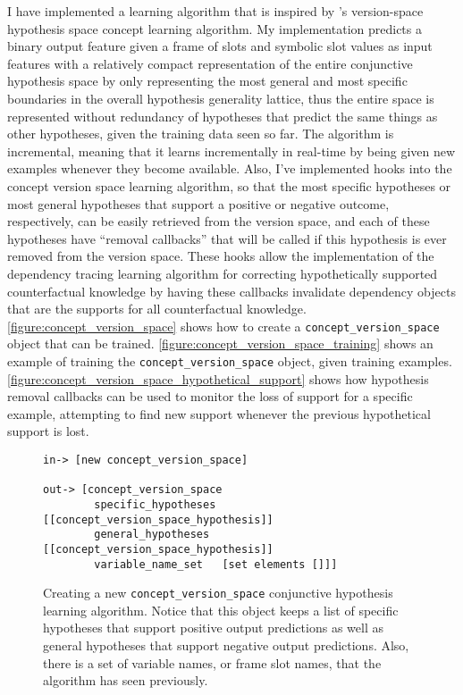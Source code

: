 I have implemented a learning algorithm that is inspired by
\citeauthor{mitchell:1997}'s \citeyear{mitchell:1997} version-space
hypothesis space concept learning algorithm.  My implementation
predicts a binary output feature given a frame of slots and symbolic
slot values as input features with a relatively compact representation
of the entire conjunctive hypothesis space by only representing the
most general and most specific boundaries in the overall hypothesis
generality lattice, thus the entire space is represented without
redundancy of hypotheses that predict the same things as other
hypotheses, given the training data seen so far.  The algorithm is
incremental, meaning that it learns incrementally in real-time by
being given new examples whenever they become available.  Also, I've
implemented hooks into the concept version space learning algorithm,
so that the most specific hypotheses or most general hypotheses that
support a positive or negative outcome, respectively, can be easily
retrieved from the version space, and each of these hypotheses have
``removal callbacks'' that will be called if this hypothesis is ever
removed from the version space.  These hooks allow the implementation
of the dependency tracing learning algorithm for correcting
hypothetically supported counterfactual knowledge by having these
callbacks invalidate dependency objects that are the supports for all
counterfactual knowledge.
{\mbox{\autoref{figure:concept_version_space}}} shows how to create a
{\tt{concept\_version\_space}} object that can be trained.
{\mbox{\autoref{figure:concept_version_space_training}}} shows an
example of training the {\tt{concept\_version\_space}} object, given
training examples.
{\mbox{\autoref{figure:concept_version_space_hypothetical_support}}}
shows how hypothesis removal callbacks can be used to monitor the loss
of support for a specific example, attempting to find new support
whenever the previous hypothetical support is lost.
\begin{figure}[h]
\centering
{\small
\begin{Verbatim}[frame=single]
 in-> [new concept_version_space]

out-> [concept_version_space
        specific_hypotheses [[concept_version_space_hypothesis]]
        general_hypotheses  [[concept_version_space_hypothesis]]
        variable_name_set   [set elements []]]
\end{Verbatim}
}
\caption[Creating a new {\tt{concept\_version\_space}} conjunctive
  hypothesis learning algorithm.]{Creating a new
  {\tt{concept\_version\_space}} conjunctive hypothesis learning
  algorithm.  Notice that this object keeps a list of specific
  hypotheses that support positive output predictions as well as
  general hypotheses that support negative output predictions.  Also,
  there is a set of variable names, or frame slot names, that the
  algorithm has seen previously.}
\label{figure:concept_version_space}
\end{figure}
